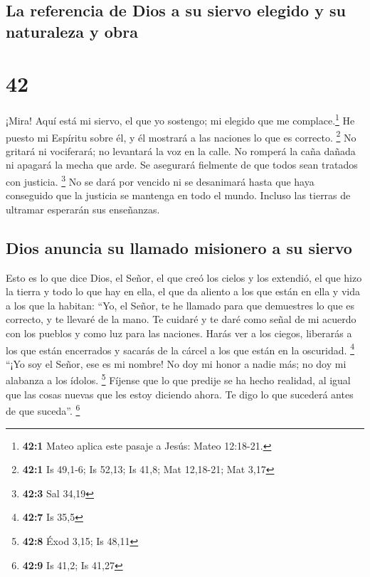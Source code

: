 \hypertarget{la-referencia-de-dios-a-su-siervo-elegido-y-su-naturaleza-y-obra}{%
\subsection{La referencia de Dios a su siervo elegido y su naturaleza y
obra}\label{la-referencia-de-dios-a-su-siervo-elegido-y-su-naturaleza-y-obra}}

\hypertarget{section-41}{%
\section{42}\label{section-41}}

 ¡Mira! Aquí está mi siervo, el que yo sostengo; mi
elegido que me complace.\footnote{\textbf{42:1} Mateo aplica este pasaje
  a Jesús: Mateo 12:18-21.} He puesto mi Espíritu sobre él, y él
mostrará a las naciones lo que es correcto. \footnote{\textbf{42:1} Is
  49,1-6; Is 52,13; Is 41,8; Mat 12,18-21; Mat 3,17}  No
gritará ni vociferará; no levantará la voz en la calle. 
No romperá la caña dañada ni apagará la mecha que arde. Se asegurará
fielmente de que todos sean tratados con justicia. \footnote{\textbf{42:3}
  Sal 34,19}  No se dará por vencido ni se desanimará
hasta que haya conseguido que la justicia se mantenga en todo el mundo.
Incluso las tierras de ultramar esperarán sus enseñanzas.

\hypertarget{dios-anuncia-su-llamado-misionero-a-su-siervo}{%
\subsection{Dios anuncia su llamado misionero a su
siervo}\label{dios-anuncia-su-llamado-misionero-a-su-siervo}}

 Esto es lo que dice Dios, el Señor, el que creó los
cielos y los extendió, el que hizo la tierra y todo lo que hay en ella,
el que da aliento a los que están en ella y vida a los que la habitan:
 ``Yo, el Señor, te he llamado para que demuestres lo que
es correcto, y te llevaré de la mano. Te cuidaré y te daré como señal de
mi acuerdo con los pueblos y como luz para las naciones. 
Harás ver a los ciegos, liberarás a los que están encerrados y sacarás
de la cárcel a los que están en la oscuridad. \footnote{\textbf{42:7} Is
  35,5}  ``¡Yo soy el Señor, ese es mi nombre! No doy mi
honor a nadie más; no doy mi alabanza a los ídolos. \footnote{\textbf{42:8}
  Éxod 3,15; Is 48,11}  Fíjense que lo que predije se ha
hecho realidad, al igual que las cosas nuevas que les estoy diciendo
ahora. Te digo lo que sucederá antes de que suceda''. \footnote{\textbf{42:9}
  Is 41,2; Is 41,27}

